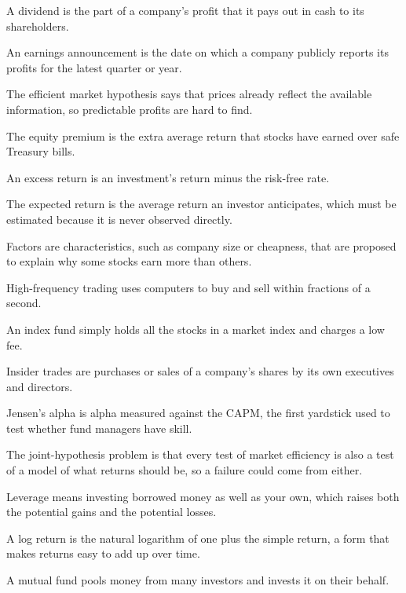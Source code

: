 \begin{keyterms}
\begin{description}[leftmargin=0pt, itemsep=0pt, parsep=0pt, topsep=0pt, font=\normalfont\bfseries\color{FEMaroon}]
  \item[Dividend.] A dividend is the part of a company's profit that it pays out in cash to its shareholders.
  \item[Earnings announcement.] An earnings announcement is the date on which a company publicly reports its profits for the latest quarter or year.
  \item[Efficient market hypothesis.] The efficient market hypothesis says that prices already reflect the available information, so predictable profits are hard to find.
  \item[Equity premium.] The equity premium is the extra average return that stocks have earned over safe Treasury bills.
  \item[Excess return.] An excess return is an investment's return minus the risk-free rate.
  \item[Expected return.] The expected return is the average return an investor anticipates, which must be estimated because it is never observed directly.
  \item[Factors.] Factors are characteristics, such as company size or cheapness, that are proposed to explain why some stocks earn more than others.
  \item[High-frequency trading.] High-frequency trading uses computers to buy and sell within fractions of a second.
  \item[Index fund.] An index fund simply holds all the stocks in a market index and charges a low fee.
  \item[Insider trades.] Insider trades are purchases or sales of a company's shares by its own executives and directors.
  \item[Jensen's alpha.] Jensen's alpha is alpha measured against the CAPM, the first yardstick used to test whether fund managers have skill.
  \item[Joint-hypothesis problem.] The joint-hypothesis problem is that every test of market efficiency is also a test of a model of what returns should be, so a failure could come from either.
  \item[Leverage.] Leverage means investing borrowed money as well as your own, which raises both the potential gains and the potential losses.
  \item[Log return.] A log return is the natural logarithm of one plus the simple return, a form that makes returns easy to add up over time.
  \item[Mutual fund.] A mutual fund pools money from many investors and invests it on their behalf.

\end{description}
\end{keyterms}
